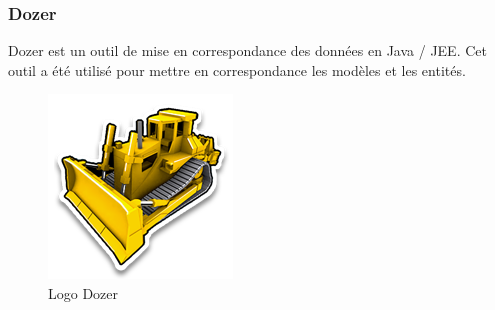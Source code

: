 \subsubsection{Dozer}
\noindent\begin{minipage}{0.69\textwidth}
Dozer est un outil de mise en correspondance des données en Java / JEE. Cet outil a été utilisé pour mettre en correspondance les modèles et les entités.
\end{minipage}
\begin{minipage}{0.3\textwidth}
\begin{figure}[H]
  \centering
  \includegraphics[scale=0.38]{figures/logo/dozer.png}
  \caption{Logo Dozer}
  \label{code35}
\end{figure}
\end{minipage}
